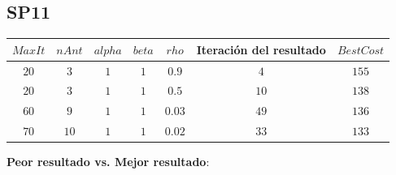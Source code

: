 \documentclass[12pt, a4paper]{article}
\begin{document}
\subsection{SP11} \label{subsec:sp11}

\begin{table}[!ht]
    \begin{adjustbox}{width=\textwidth}
        \begin{tabular}{|c|c|c|c|c|c|c|}
            \rowcolor{yellow}
            \hline
            $MaxIt$ & $nAnt$ & $alpha$ & $beta$ & $rho$  & Iteración del resultado & $BestCost$ \\
            \hline
            $20$    & $3$    & $1$     & $1$    & $0.9$  & $4$                     & $155$      \\
            \hline
            $20$    & $3$    & $1$     & $1$    & $0.5$  & $10$                    & $138$      \\
            \hline
            $60$    & $9$    & $1$     & $1$    & $0.03$ & $49$                    & $136$      \\
            \hline
            $70$    & $10$   & $1$     & $1$    & $0.02$ & $33$                    & $133$      \\
            \hline
        \end{tabular}
    \end{adjustbox}
\end{table}

\textbf{Peor resultado vs. Mejor resultado}:
\end{document}
